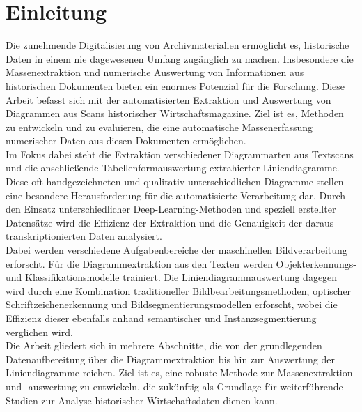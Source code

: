 \chapter{Einleitung}
\label{ch:einleitung}

Die zunehmende Digitalisierung von Archivmaterialien ermöglicht es, historische Daten in einem nie dagewesenen Umfang zugänglich zu machen. Insbesondere die Massenextraktion und numerische Auswertung von Informationen aus historischen Dokumenten bieten ein enormes Potenzial für die Forschung. Diese Arbeit befasst sich mit der automatisierten Extraktion und Auswertung von Diagrammen aus Scans historischer Wirtschaftsmagazine. Ziel ist es, Methoden zu entwickeln und zu evaluieren, die eine automatische Massenerfassung numerischer Daten aus diesen Dokumenten ermöglichen.
\\
Im Fokus dabei steht die Extraktion verschiedener Diagrammarten aus Textscans und die anschließende Tabellenformauswertung extrahierter Liniendiagramme. Diese oft handgezeichneten und qualitativ unterschiedlichen Diagramme stellen eine besondere Herausforderung für die automatisierte Verarbeitung dar. Durch den Einsatz unterschiedlicher Deep-Learning-Methoden und speziell erstellter Datensätze wird die Effizienz der Extraktion und die Genauigkeit der daraus transkriptionierten Daten analysiert.
\\
Dabei werden verschiedene Aufgabenbereiche der maschinellen Bildverarbeitung erforscht. Für die Diagrammextraktion aus den Texten werden Objekterkennungs- und Klassifikationsmodelle trainiert. Die Liniendiagrammauswertung dagegen wird durch eine Kombination traditioneller Bildbearbeitungsmethoden, optischer Schriftzeichenerkennung und Bildsegmentierungsmodellen erforscht, wobei die Effizienz dieser ebenfalls anhand semantischer und Instanzsegmentierung verglichen wird.
\\
Die Arbeit gliedert sich in mehrere Abschnitte, die von der grundlegenden Datenaufbereitung über die Diagrammextraktion bis hin zur Auswertung der Liniendiagramme reichen. Ziel ist es, eine robuste Methode zur Massenextraktion und -auswertung zu entwickeln, die zukünftig als Grundlage für weiterführende Studien zur Analyse historischer Wirtschaftsdaten dienen kann.
